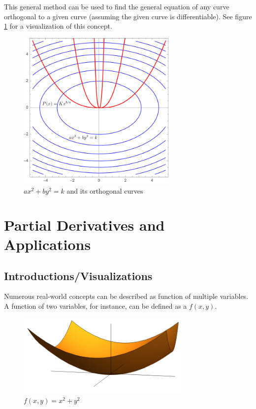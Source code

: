 \documentclass[12pt]{article}
\begin{document}
This general method can be used to find the general equation of any curve orthogonal to a given curve (assuming the given curve is differentiable). See figure \ref{fig:orthogonalcurves} for a visualization of this concept.

\begin{figure}[!ht]
    \centering
    \includegraphics[width=7.8cm]{misc/orthogonalcurves.png}
    \caption{$ax^2+by^2=k$ and its orthogonal curves}
    \label{fig:orthogonalcurves}
\end{figure}

\section{Partial Derivatives and Applications}

\subsection{Introductions/Visualizations}

Numerous real-world concepts can be described as function of multiple variables. A function of two variables, for instance, can be defined as a $f(x,y)$. 

\begin{figure}[!ht]
    \centering
    \includegraphics[width=8.5cm]{misc/xsquaredysquared.png}
    \caption{$f(x,y)=x^2+y^2$}
    \label{fig:2dfunction}
\end{figure}
\end{document}
